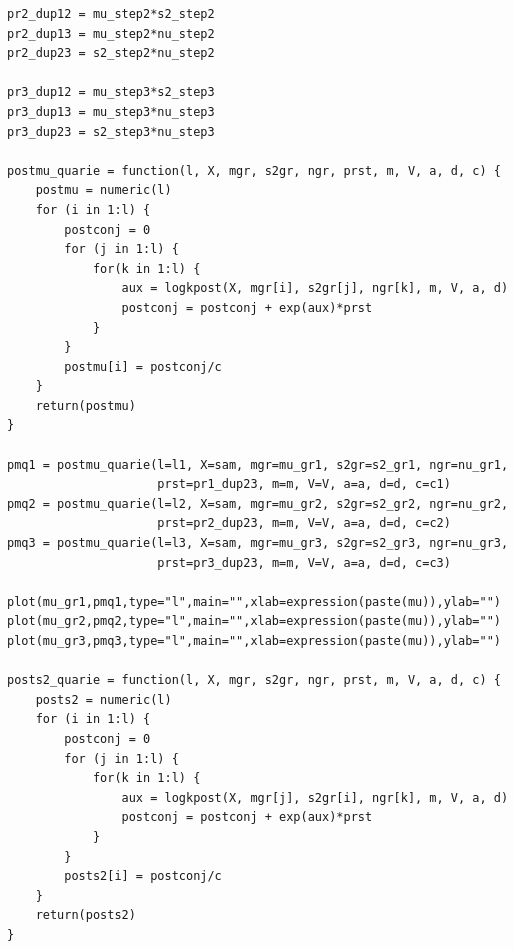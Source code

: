 \documentclass[12pt,reqno,a4paper,oneside]{article}
\begin{document}
\newpage

\begin{verbatim}
pr2_dup12 = mu_step2*s2_step2
pr2_dup13 = mu_step2*nu_step2
pr2_dup23 = s2_step2*nu_step2

pr3_dup12 = mu_step3*s2_step3
pr3_dup13 = mu_step3*nu_step3
pr3_dup23 = s2_step3*nu_step3

postmu_quarie = function(l, X, mgr, s2gr, ngr, prst, m, V, a, d, c) {
	postmu = numeric(l)
	for (i in 1:l) {
		postconj = 0
		for (j in 1:l) {
			for(k in 1:l) {
				aux = logkpost(X, mgr[i], s2gr[j], ngr[k], m, V, a, d)
				postconj = postconj + exp(aux)*prst
			}
		}
		postmu[i] = postconj/c
	}
	return(postmu)
}

pmq1 = postmu_quarie(l=l1, X=sam, mgr=mu_gr1, s2gr=s2_gr1, ngr=nu_gr1,
					 prst=pr1_dup23, m=m, V=V, a=a, d=d, c=c1)
pmq2 = postmu_quarie(l=l2, X=sam, mgr=mu_gr2, s2gr=s2_gr2, ngr=nu_gr2,
					 prst=pr2_dup23, m=m, V=V, a=a, d=d, c=c2)
pmq3 = postmu_quarie(l=l3, X=sam, mgr=mu_gr3, s2gr=s2_gr3, ngr=nu_gr3,
					 prst=pr3_dup23, m=m, V=V, a=a, d=d, c=c3)

plot(mu_gr1,pmq1,type="l",main="",xlab=expression(paste(mu)),ylab="")
plot(mu_gr2,pmq2,type="l",main="",xlab=expression(paste(mu)),ylab="")
plot(mu_gr3,pmq3,type="l",main="",xlab=expression(paste(mu)),ylab="")

posts2_quarie = function(l, X, mgr, s2gr, ngr, prst, m, V, a, d, c) {
	posts2 = numeric(l)
	for (i in 1:l) {
		postconj = 0
		for (j in 1:l) {
			for(k in 1:l) {
				aux = logkpost(X, mgr[j], s2gr[i], ngr[k], m, V, a, d)
				postconj = postconj + exp(aux)*prst
			}
		}
		posts2[i] = postconj/c
	}
	return(posts2)
}

\end{verbatim}

\newpage
\end{document}
